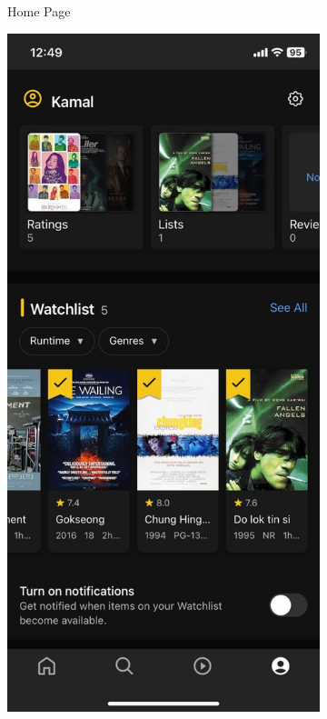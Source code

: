 \begin{figure} [h]
\begin{subfigure}{.3\linewidth}
      \caption{Home Page}
      \label{fig:myfig29}
    \end{subfigure}%
    \hspace{1em}%
    \begin{subfigure}{.3\linewidth}
      \centering
      \includegraphics[width = \linewidth]{mainmatter/images/imdb2.jpg}

\end{subfigure}
\end{figure}
